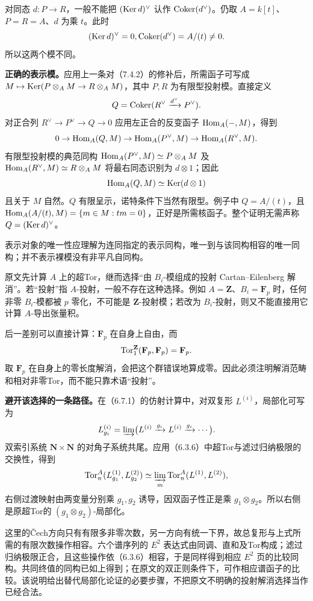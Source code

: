 对同态 $d:P\to R$，一般不能把 $(\operatorname{Ker} d)^\vee$ 认作 $\operatorname{Coker}(d^\vee)$。仍取 $A=k[t]$、$P=R=A$、$d$ 为乘 $t$。此时
\[
 (\operatorname{Ker} d)^\vee=0,
 \operatorname{Coker}(d^\vee)=A/(t)\ne0.
\]
所以这两个模不同。

\textbf{正确的表示模。}应用上一条对（7.4.2）的修补后，所需函子可写成 $M\mapsto\operatorname{Ker}(P\otimes_A M\to R\otimes_A M)$，其中 $P,R$ 为有限型投射模。直接定义
\[
 Q=\operatorname{Coker}(R^\vee\xrightarrow{d^\vee}P^\vee).
\]
对正合列 $R^\vee\to P^\vee\to Q\to0$ 应用左正合的反变函子 $\operatorname{Hom}_A(-,M)$，得到
\[
 0\to\operatorname{Hom}_A(Q,M)\to\operatorname{Hom}_A(P^\vee,M)
 \to\operatorname{Hom}_A(R^\vee,M).
\]
有限型投射模的典范同构 $\operatorname{Hom}_A(P^\vee,M)\simeq P\otimes_A M$ 及 $\operatorname{Hom}_A(R^\vee,M)\simeq R\otimes_A M$ 将最右同态识别为 $d\otimes1$；因此
\[
 \operatorname{Hom}_A(Q,M)\simeq\operatorname{Ker}(d\otimes1)
\]
且关于 $M$ 自然。$Q$ 有限呈示，诺特条件下当然有限型。例子中 $Q=A/(t)$，且 $\operatorname{Hom}_A(A/(t),M)=\{m\in M:tm=0\}$，正好是所需核函子。整个证明无需声称 $Q=(\operatorname{Ker} d)^\vee$。

表示对象的唯一性应理解为连同指定的表示同构，唯一到与该同构相容的唯一同构；并不表示裸模没有非平凡自同构。

原文先计算 $A$ 上的超Tor，继而选择“由 $B_i$-模组成的投射 Cartan--Eilenberg 解消”。若“投射”指 $A$-投射，一般不存在这种选择。例如 $A=\mathbf Z$、$B_i=\mathbf F_p$ 时，任何非零 $B_i$-模都被 $p$ 零化，不可能是 $\mathbf Z$-投射模；若改为 $B_i$-投射，则又不能直接用它计算 $A$-导出张量积。

后一差别可以直接计算：$\mathbf F_p$ 在自身上自由，而
\[
 \operatorname{Tor}_1^{\mathbf Z}(\mathbf F_p,\mathbf F_p)=\mathbf F_p.
\]
取 $\mathbf F_p$ 在自身上的零长度解消，会把这个群错误地算成零。因此必须注明解消范畴和相对非零Tor，而不能只靠术语“投射”。

\textbf{避开该选择的一条路径。}在（6.7.1）的仿射计算中，对双复形 $L^{(i)}$，局部化可写为
\[
 L^{(i)}_{g_i}=\varinjlim\bigl(L^{(i)}\xrightarrow{g_i}L^{(i)}
 \xrightarrow{g_i}\cdots\bigr).
\]
双索引系统 $\mathbf N\times\mathbf N$ 的对角子系统共尾。应用（6.3.6）中超Tor与滤过归纳极限的交换性，得到
\[
 \operatorname{Tor}_n^A(L^{(1)}_{g_1},L^{(2)}_{g_2})
 \simeq\varinjlim_m\operatorname{Tor}_n^A(L^{(1)},L^{(2)}),
\]
右侧过渡映射由两变量分别乘 $g_1,g_2$ 诱导，因双函子性正是乘 $g_1\otimes g_2$。所以右侧是原超Tor的 $(g_1\otimes g_2)$-局部化。

这里的Čech方向只有有限多非零次数，另一方向有统一下界，故总复形与上式所需的有限次数操作相容。六个谱序列的 $E^2$ 表达式由同调、直和及Tor构成；滤过归纳极限正合，且这些操作依（6.3.6）相容，于是同样得到相应 $E^2$ 页的比较同构。共同终值的同构已如上得到；在原文的双正则条件下，可作相应谱函子的比较。该说明给出替代局部化论证的必要步骤，不把原文不明确的投射解消选择当作已经合法。


